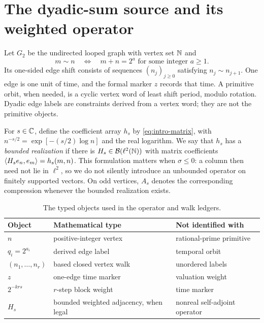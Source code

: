 \section{The dyadic-sum source and its weighted operator}
\label{sec:source}

Let $G_2$ be the undirected looped graph with vertex set $\mathbb N$ and
\begin{equation}
  m\sim n \quad\Longleftrightarrow\quad
  m+n=2^a\text{ for some integer }a\ge1.
  \label{eq:edge-relation}
\end{equation}
Its one-sided edge shift consists of sequences
$(n_j)_{j\ge0}$ satisfying $n_j\sim n_{j+1}$.  One edge is one unit of
time, and the formal marker $z$ records that time.  A primitive orbit, when
needed, is a cyclic vertex word of least shift period, modulo rotation.
Dyadic edge labels are constraints derived from a vertex word; they are not
the primitive objects.

For $s\in\mathbb C$, define the coefficient array $h_s$ by
\cref{eq:intro-matrix}, with
$n^{-s/2}=\exp[-(s/2)\log n]$ and the real logarithm.  We say that $h_s$
has a \emph{bounded realization} if there is $H_s\in\mathcal B(\ell^2(\mathbb N))$ with
matrix coefficients $\langle H_se_n,e_m\rangle=h_s(m,n)$.  This formulation matters
when $\sigma\le0$: a column then need not lie in $\ell^2$, so we do not
silently introduce an unbounded operator on finitely supported vectors.  On
odd vertices, $A_s$ denotes the corresponding compression whenever the
bounded realization exists.

\begin{table}[t]
  \centering
  \caption{The typed objects used in the operator and walk ledgers.}
  \label{tab:typed-objects}
  \small
  \begin{tabular}{@{}lll@{}}
    \toprule
    Object & Mathematical type & Not identified with \\
    \midrule
    $n$ & positive-integer vertex & rational-prime primitive \\
    $q_i=2^{a_i}$ & derived edge label & temporal orbit \\
    $(n_1,\ldots,n_r)$ & based closed vertex walk & unordered labels \\
    $z$ & one-edge time marker & valuation weight \\
    $2^{-krs}$ & $r$-step block weight & time marker \\
    $H_s$ & bounded weighted adjacency, when legal & nonreal self-adjoint operator \\
    \bottomrule
  \end{tabular}
\end{table}

